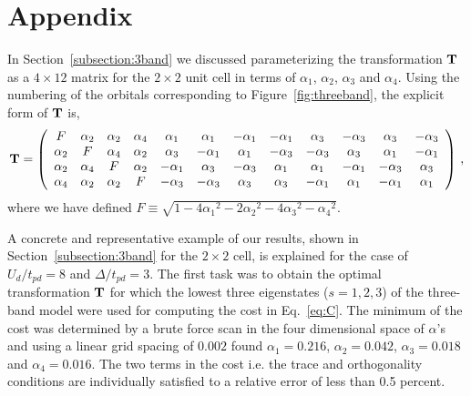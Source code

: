 \section*{Appendix}
In Section~\ref{subsection:3band} we discussed parameterizing the transformation ${\bf T}$ 
as a $4\times12$ matrix for the $2 \times 2$ unit cell in terms of $\alpha_1$, $\alpha_2$, $\alpha_3$ 
and $\alpha_4$. Using the numbering of the orbitals corresponding to Figure~\ref{fig:threeband}, 
the explicit form of ${\bf T}$ is,
\begin{eqnarray}
{\bf T} = 
\left(
\begin{array}{cccccccccccc}
F        & \alpha_2 &        \alpha_2 &  \alpha_4 & \alpha_1 & \alpha_1 & -\alpha_1 & -\alpha_1 & \alpha_3 & -\alpha_3 & \alpha_3 & -\alpha_3 \\
\alpha_2 &  F       &        \alpha_4 &  \alpha_2 & \alpha_3 & -\alpha_1 & \alpha_1 & -\alpha_3 & -\alpha_3 & \alpha_3 & \alpha_1 & -\alpha_1 \\
\alpha_2 & \alpha_4 & F               &  \alpha_2 & -\alpha_1 & \alpha_3 & -\alpha_3 & \alpha_1 & \alpha_1 & -\alpha_1 & -\alpha_3 & \alpha_3 \\
\alpha_4 & \alpha_2 & \alpha_2        &   F       & -\alpha_3 & -\alpha_3 & \alpha_3 & \alpha_3 & -\alpha_1 & \alpha_1 & -\alpha_1 & \alpha_1 \\
\end{array}
\right)\,,
\end{eqnarray}
where we have defined $F \equiv \sqrt{1-4{\alpha_1}^2 - 2{\alpha_2}^2 - 4 {\alpha_3}^2 -{\alpha_4}^2}$.

A concrete and representative example of our results, shown in Section~\ref{subsection:3band} 
for the $2\times2$ cell, is explained for the case of $U_d/t_{pd}=8$ and $\Delta/t_{pd}=3$. 
The first task was to obtain the optimal transformation ${\bf T}$ 
for which the lowest three eigenstates ($s=1,2,3$) of the three-band model were used for 
computing the cost in Eq.~\eqref{eq:C}. The minimum of the cost was 
determined by a brute force scan in the four dimensional space of $\alpha$'s and 
using a linear grid spacing of $0.002$ found $\alpha_1=0.216$, $\alpha_2=0.042$, $\alpha_3=0.018$ and $\alpha_4=0.016$. 
The two terms in the cost i.e. the trace and orthogonality conditions are individually satisfied to a relative error of 
less than 0.5 percent. 

